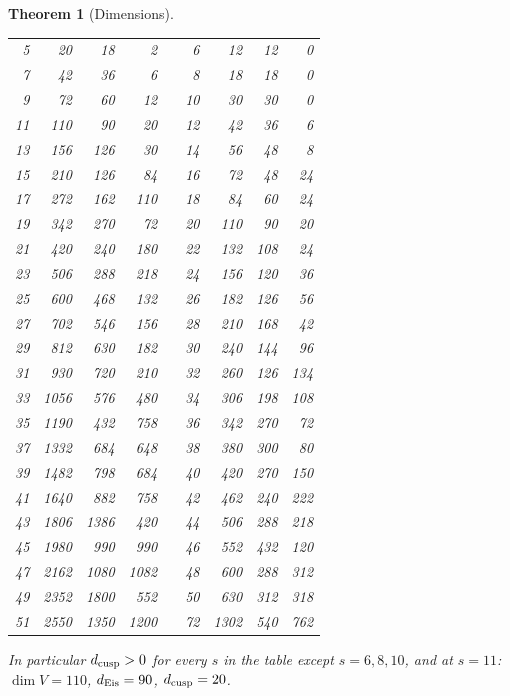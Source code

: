 \documentclass[11pt]{article}
\newtheorem{theorem}{Theorem}[section]
\theoremstyle{definition}
\begin{document}
\begin{theorem}[Dimensions]
\begin{center}
\begin{longtable}{rrrrcrrrr}
5 & 20 & 18 & 2 && 6 & 12 & 12 & 0\\
7 & 42 & 36 & 6 && 8 & 18 & 18 & 0\\
9 & 72 & 60 & 12 && 10 & 30 & 30 & 0\\
11 & 110 & 90 & 20 && 12 & 42 & 36 & 6\\
13 & 156 & 126 & 30 && 14 & 56 & 48 & 8\\
15 & 210 & 126 & 84 && 16 & 72 & 48 & 24\\
17 & 272 & 162 & 110 && 18 & 84 & 60 & 24\\
19 & 342 & 270 & 72 && 20 & 110 & 90 & 20\\
21 & 420 & 240 & 180 && 22 & 132 & 108 & 24\\
23 & 506 & 288 & 218 && 24 & 156 & 120 & 36\\
25 & 600 & 468 & 132 && 26 & 182 & 126 & 56\\
27 & 702 & 546 & 156 && 28 & 210 & 168 & 42\\
29 & 812 & 630 & 182 && 30 & 240 & 144 & 96\\
31 & 930 & 720 & 210 && 32 & 260 & 126 & 134\\
33 & 1056 & 576 & 480 && 34 & 306 & 198 & 108\\
35 & 1190 & 432 & 758 && 36 & 342 & 270 & 72\\
37 & 1332 & 684 & 648 && 38 & 380 & 300 & 80\\
39 & 1482 & 798 & 684 && 40 & 420 & 270 & 150\\
41 & 1640 & 882 & 758 && 42 & 462 & 240 & 222\\
43 & 1806 & 1386 & 420 && 44 & 506 & 288 & 218\\
45 & 1980 & 990 & 990 && 46 & 552 & 432 & 120\\
47 & 2162 & 1080 & 1082 && 48 & 600 & 288 & 312\\
49 & 2352 & 1800 & 552 && 50 & 630 & 312 & 318\\
51 & 2550 & 1350 & 1200 && 72 & 1302 & 540 & 762\\
\bottomrule
\end{longtable}
\end{center}
In particular $d_{\rm cusp}>0$ for every $s$ in the table except $s=6,8,10$, and at $s=11$: $\dim V=110$, $d_{\rm Eis}=90$, $d_{\rm cusp}=20$.
\end{theorem}
\end{document}
